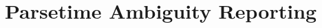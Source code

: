 \documentclass[sigplan]{acmart}\settopmatter{printfolios=true,printccs=false,printacmref=false}
\newcommand{\T}{\mathbb{T}} %
\newcommand{\yield}{\mathit{yield}} %
\begin{document}
\clearpage


\section{Parsetime Ambiguity Reporting} \label{sec:parse-time-reporting}














\end{document}
